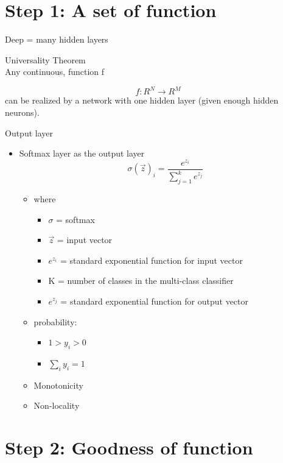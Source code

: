 \documentclass[
]{book}
\providecommand{\tightlist}{%
  \setlength{\itemsep}{0pt}\setlength{\parskip}{0pt}}
\begin{document}
\hypertarget{step-1-a-set-of-function}{%
\section{Step 1: A set of function}\label{step-1-a-set-of-function}}

Deep = many hidden layers

Universality Theorem\\
Any continuous, function f

\[
f: R^N \to R^M
\] can be realized by a network with one hidden layer (given enough hidden neurons).

Output layer

\begin{itemize}
\item
  Softmax layer as the output layer\\
  \[
  \sigma(\vec{z})_i = \frac{e^{z_i}}{\sum_{j=1}^k e^{z_j}}
  \]

  \begin{itemize}
  \item
    where

    \begin{itemize}
    \tightlist
    \item
      \(\sigma\) = softmax
    \item
      \(\vec{z}\) = input vector
    \item
      \(e^{z_i}\) = standard exponential function for input vector
    \item
      K = number of classes in the multi-class classifier
    \item
      \(e^{z_j}\) = standard exponential function for output vector
    \end{itemize}
  \item
    probability:

    \begin{itemize}
    \tightlist
    \item
      \(1 > y_i > 0\)
    \item
      \(\sum_i y_i = 1\)
    \end{itemize}
  \item
    Monotonicity\\
  \item
    Non-locality
  \end{itemize}
\end{itemize}

\hypertarget{step-2-goodness-of-function}{%
\section{Step 2: Goodness of function}\label{step-2-goodness-of-function}}
\end{document}
